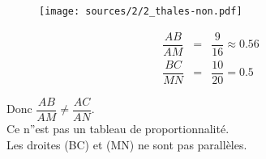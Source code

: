 \documentclass[12pt]{article}
\begin{document}
\begin{multicols}{2}
\begin{multicols}{2}
    \begin{figure}[H]
      \centering
      \texttt{[image: sources/2/2\_thales-non.pdf]}
    \end{figure}

    \begin{eqnarray*}
      \dfrac{AB}{AM} &=& \dfrac{9}{16} \approx 0.56\\
      \dfrac{BC}{MN} &=& \dfrac{10}{20} = 0.5
    \end{eqnarray*}
    
    Donc $\dfrac{AB}{AM} \neq \dfrac{AC}{AN}$. \\
    Ce n''est pas un tableau de proportionnalité.\\
    Les droites (BC) et (MN) ne sont pas parallèles.
  \end{multicols}

\end{multicols}
\end{document}
